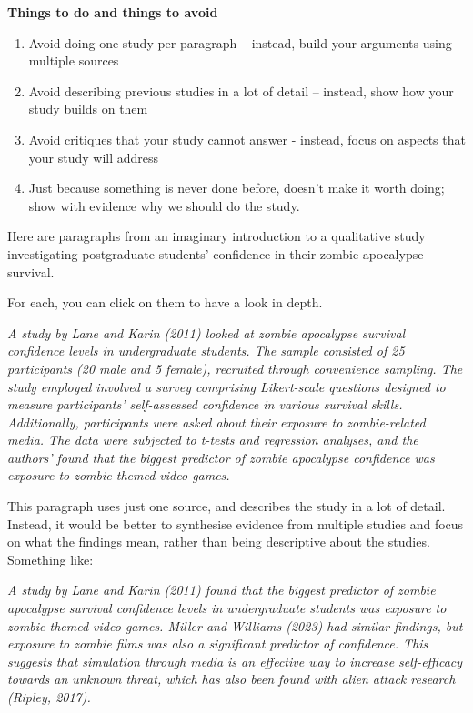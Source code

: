 \documentclass[
  english,
  letterpaper,
  DIV=11,
  numbers=noendperiod]{scrreprt}
\providecommand{\tightlist}{%
  \setlength{\itemsep}{0pt}\setlength{\parskip}{0pt}}
\begin{document}
\textbf{Things to do and things to avoid}

\begin{enumerate}
\def\labelenumi{\arabic{enumi}.}
\tightlist
\item
  Avoid doing one study per paragraph -- instead, build your arguments
  using multiple sources
\item
  Avoid describing previous studies in a lot of detail -- instead, show
  how your study builds on them
\item
  Avoid critiques that your study cannot answer - instead, focus on
  aspects that your study will address
\item
  Just because something is never done before, doesn't make it worth
  doing; show with evidence why we should do the study.
\end{enumerate}

Here are paragraphs from an imaginary introduction to a qualitative
study investigating postgraduate students' confidence in their zombie
apocalypse survival.

For each, you can click on them to have a look in depth.

\begin{tcolorbox}[enhanced jigsaw, breakable, bottomtitle=1mm, leftrule=.75mm, opacityback=0, colbacktitle=quarto-callout-caution-color!10!white, opacitybacktitle=0.6, toprule=.15mm, colback=white, left=2mm, coltitle=black, bottomrule=.15mm, titlerule=0mm, title={Show me Example 1: Using one source, writing descriptively}, toptitle=1mm, colframe=quarto-callout-caution-color-frame, arc=.35mm, rightrule=.15mm]

\emph{A study by Lane and Karin (2011) looked at zombie apocalypse
survival confidence levels in undergraduate students. The sample
consisted of 25 participants (20 male and 5 female), recruited through
convenience sampling. The study employed involved a survey comprising
Likert-scale questions designed to measure participants' self-assessed
confidence in various survival skills. Additionally, participants were
asked about their exposure to zombie-related media. The data were
subjected to t-tests and regression analyses, and the authors' found
that the biggest predictor of zombie apocalypse confidence was exposure
to zombie-themed video games.}

This paragraph uses just one source, and describes the study in a lot of
detail. Instead, it would be better to synthesise evidence from multiple
studies and focus on what the findings mean, rather than being
descriptive about the studies. Something like:

\emph{A study by Lane and Karin (2011) found that the biggest predictor
of zombie apocalypse survival confidence levels in undergraduate
students was exposure to zombie-themed video games. Miller and Williams
(2023) had similar findings, but exposure to zombie films was also a
significant predictor of confidence. This suggests that simulation
through media is an effective way to increase self-efficacy towards an
unknown threat, which has also been found with alien attack research
(Ripley, 2017).}

\end{tcolorbox}
\end{document}
